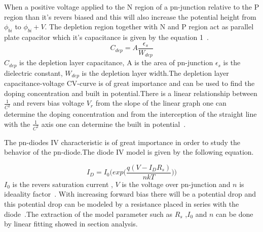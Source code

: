 \documentclass[letterpaper,12pt]{article}
\begin{document}
\begin{minipage}{\linewidth}%
\label{visina8}%
\end{minipage}

\begin{minipage}{\linewidth}%
\label{visina8}%
\end{minipage}\bigskip

When a positive voltage applied to the N region of a pn-junction relative to the P region than it's revers biased and this will also increase the potential height from $\phi_{bi}$ to $\phi_{bi} + V$. The depletion region together with N and P region act as parallel plate capacitor which it's capacitance is given by the equation 1~\cite{hu}.
\begin{equation}
    C_{dep} = A\frac{\epsilon_s}{W_{dep}}
\end{equation}
$C_{dep}$ is the depletion layer capacitance, A is the area of pn-junction $\epsilon_s$ is the dielectric constant, $W_{dep}$ is the depletion layer width.The
depletion layer capacitance-voltage CV-curve is of great importance and can be used to find the doping concentration and built in potential.There is a linear relationship between $\frac{1}{C^2}$ and revers bias voltage $V_r$  from the slope of the linear graph one can determine the doping concentration and from the interception of the straight line with the $\frac{1}{C^2}$ axis one can determine the built in potential~\cite{hu}.
\bigskip

The pn-diodes IV characteristic is of great importance in order to study the behavior of the pn-diode.The diode IV model is given by the following equation.

\begin{equation}
    I_D = I_0\bigg(exp\Big(\frac{q(V-I_DR_s)}{nkT}\Big)\bigg)
\end{equation}
$I_0$ is the revers saturation current , $V$ is the voltage over pn-junction and $n$ is ideaality factor~\cite{lab}. With increasing forward bias there will be a potential drop and this potential drop can be modeled by a resistance placed in series with the diode~\cite{lab}.The extraction of the model parameter such as $R_s$ ,$I_0$ and $n$ can be done by linear fitting showed in section analysis.
\end{document}
